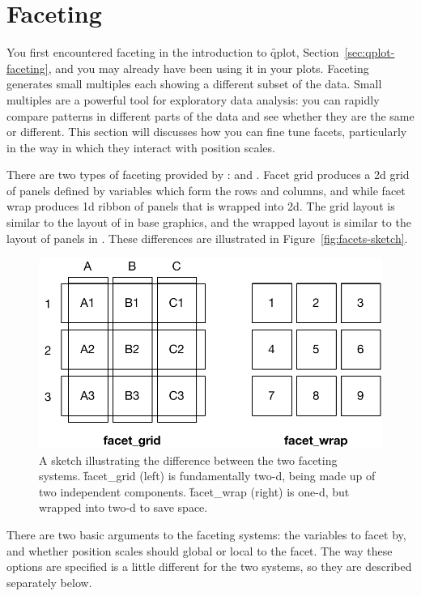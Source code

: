 \section{Faceting}
\label{sec:faceting}

You first encountered faceting in the introduction to \f{qplot}, Section~\ref{sec:qplot-faceting}, and you may already have been using it in your plots.  Faceting generates small multiples each showing a different subset of the data.  Small multiples are a powerful tool for exploratory data analysis: you can rapidly compare patterns in different parts of the data and see whether they are the same or different.  This section will discusses how you can fine tune facets, particularly in the way in which they interact with position scales. 

There are two types of faceting provided by \ggplot:  and .  Facet grid produces a 2d grid of panels defined by variables which form the rows and columns, and while facet wrap produces 1d ribbon of panels that is wrapped into 2d.  The grid layout is similar to the layout of  in base graphics, and the wrapped layout is similar to the layout of panels in .  These differences are illustrated in Figure~\ref{fig:facets-sketch}.

\begin{figure}[htbp]
  \centering
    \includegraphics[width=0.5\linewidth]{position-facets}
  \caption{A sketch illustrating the difference between the two faceting systems.   \f{facet_grid} (left) is fundamentally two-d, being made up of two independent components.  \f{facet_wrap} (right) is one-d, but wrapped into two-d to save space.}
  \label{fig:facet-sketch}
\end{figure}

There are two basic arguments to the faceting systems: the variables to facet by, and whether position scales should global or local to the facet.  The way these options are specified is a little different for the two systems, so they are described separately below.


